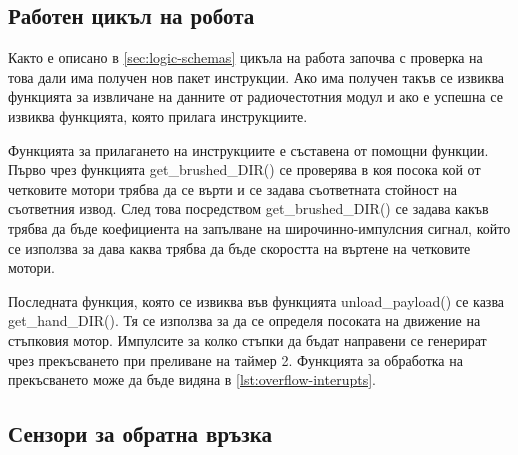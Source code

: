 
\subsection{Работен цикъл на робота}
\label{ssec:loop-robot}

Както е описано в \cref{sec:logic-schemas} цикъла на работа започва с проверка на това дали има получен нов пакет инструкции. Ако има получен такъв се извиква функцията за извличане на данните от радиочестотния модул и ако е успешна се извиква функцията, която прилага инструкциите.



Функцията за прилагането на инструкциите е съставена от помощни функции. Първо чрез функцията get\_brushed\_DIR() се проверява в коя посока кой от четковите мотори трябва да се върти и се задава съответната стойност на съответния извод. След това посредством get\_brushed\_DIR() се задава какъв трябва да бъде коефициента на запълване на широчинно-импулсния сигнал, който се използва за дава каква трябва да бъде скоростта на въртене на четковите мотори.



Последната функция, която се извиква във функцията unload\_payload() се казва get\_hand\_DIR(). Тя се използва за да се определя посоката на движение на стъпковия мотор. Импулсите за колко стъпки да бъдат направени се генерират чрез прекъсването при преливане на таймер 2. Функцията за обработка на прекъсването може да бъде видяна в \cref{lst:overflow-interupts}.




\subsection{Сензори за обратна връзка}
\label{ssec:feedback-sensors}

